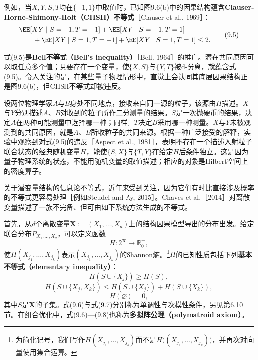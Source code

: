 \Needspace{4cm}
例如，当$X,Y,S,T$均在$\{-1,1\}$中取值时，已知图9.6(b)中的因果结构蕴含\textbf{Clauser-Horne-Shimony-Holt（CHSH）不等式}［Clauser et al., 1969］：
\begin{equation}
\begin{aligned}
 &\EE[XY\mid S=-1,T=-1]+\EE[XY\mid S=-1,T=1]\\
 &\qquad+\EE[XY\mid S=1,T=-1]+\EE[XY\mid S=1,T=1]\le2.
\end{aligned}
\tag{9.5}
\end{equation}

式(9.5)是\textbf{Bell不等式（Bell's inequality）}［Bell, 1964］的推广。潜在共同原因可以取任意多个值；只要存在一个变量，使$\{X,S\}$与$\{Y,T\}$被d-分离，就蕴含式(9.5)。令人关注的是，在某些量子物理情形中，直觉上会认同其底层因果结构正是图9.6(b)，但CHSH不等式却被违反。

设两位物理学家$A$与$B$身处不同地点，接收来自同一源的粒子，该源由$H$描述。$X$与$Y$分别描述$A$、$B$对收到的粒子所作二分测量的结果。$S$是一次抛硬币的结果，决定$A$在两种可能测量中选择哪一种；同样，$T$决定$B$采用哪一种测量。$X$与$Y$未被观测到的共同原因，就是$A$、$B$所收粒子的共同来源。根据一种广泛接受的解释，实验中观察到对式(9.5)的违反［Aspect et al., 1981］，表明不存在一个描述入射粒子联合状态的经典随机变量$H$，能使$\{S,X\}$与$\{T,Y\}$在给定$H$后条件独立。这是因为量子物理系统的状态，不能用随机变量的取值描述；相应的对象是Hilbert空间上的密度算子。

关于潜变量结构的信息论不等式，近年来受到关注，因为它们有时比直接涉及概率的不等式更容易处理［例如Steudel and Ay, 2015］。Chaves et al.［2014］对离散变量描述了一族不完备、但可由如下系统方法生成的不等式。

首先，从$d$个离散变量$\mathbf X:=(X_1,\ldots,X_d)$上的结构因果模型导出的分布出发。给定联合分布$P_{X_1,\ldots,X_d}$，可以定义函数
\[
 H:2^{\mathbf X}\longrightarrow\mathbb R_0^+,
\]
使$H(X_{j_1},\ldots,X_{j_k})$表示$(X_{j_1},\ldots,X_{j_k})$的Shannon熵。\footnote{为简化记号，我们写作$H(X_{j_1},\ldots,X_{j_k})$而不是$H\bigl((X_{j_1},\ldots,X_{j_k})\bigr)$，并再次对向量使用集合运算。}$H$的已知性质包括下列\textbf{基本不等式（elementary inequality）}：
\begin{equation}
 H(S\cup\{X_j\})\ge H(S),\tag{9.6}
\end{equation}
\begin{equation}
 H(S\cup\{X_j,X_k\})\le H(S\cup\{X_j\})+H(S\cup\{X_k\}),\tag{9.7}
\end{equation}
\begin{equation}
 H(\varnothing)=0,\tag{9.8}
\end{equation}
其中$S$是$\mathbf X$的子集。式(9.6)与式(9.7)分别称为单调性与次模性条件，另见第6.10节。在组合优化中，式(9.6)—(9.8)也称为\textbf{多拟阵公理（polymatroid axiom）}。

